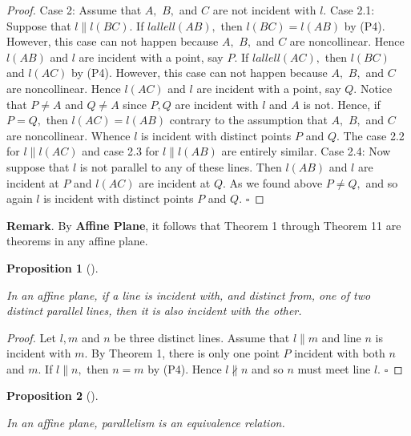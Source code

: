 \documentclass[
  twoside,
  12pt,
  letterpaper,
  fleqn]{article}
\theoremstyle{definition}
\theoremstyle{definition}
\theoremstyle{plain}
\newtheorem{proposition}{Proposition}[section]
\theoremstyle{plain}
\theoremstyle{remark}
\begin{document}
\begin{proof}
Case 2: Assume that \(A,\) \(B,\) and \(C\) are not incident with \(l.\)
Case 2.1: Suppose that \(l \parallel l(BC).\) If \(l allell(AB),\) then
\(l(BC)=l(AB)\) by (P4). However, this case can not happen because
\(A,\) \(B,\) and \(C\) are noncollinear. Hence \(l(AB)\) and \(l\) are
incident with a point, say \(P.\) If \(l allell(AC),\) then \(l(BC)\)
and \(l(AC)\) by (P4). However, this case can not happen because \(A,\)
\(B,\) and \(C\) are noncollinear. Hence \(l(AC)\) and \(l\) are
incident with a point, say \(Q.\) Notice that \(P\neq A\) and
\(Q\neq A\) since \(P, Q\) are incident with \(l\) and \(A\) is not.
Hence, if \(P=Q,\) then \(l(AC)=l(AB)\) contrary to the assumption that
\(A,\) \(B,\) and \(C\) are noncollinear. Whence \(l\) is incident with
distinct points \(P\) and \(Q.\) The case 2.2 for \(l \parallel l(AC)\)
and case 2.3 for \(l \parallel l(AB)\) are entirely similar. Case 2.4:
Now suppose that \(l\) is not parallel to any of these lines. Then
\(l(AB)\) and \(l\) are incident at \(P\) and \(l(AC)\) are incident at
\(Q.\) As we found above \(P\neq Q,\) and so again \(l\) is incident
with distinct points \(P\) and \(Q.\) \(\square\)

\end{proof}

\textbf{Remark}. By \textbf{Affine Plane}, it follows that Theorem 1
through Theorem 11 are theorems in any affine plane.

\begin{proposition}[]\protect\hypertarget{prp-five}{}\label{prp-five}

In an affine plane, if a line is incident with, and distinct from, one
of two distinct parallel lines, then it is also incident with the other.

\end{proposition}

\begin{proof}

Let \(l, m\) and \(n\) be three distinct lines. Assume that
\(l \parallel m\) and line \(n\) is incident with \(m.\) By Theorem 1,
there is only one point \(P\) incident with both \(n\) and \(m.\) If
\(l \parallel n,\) then \(n=m\) by (P4). Hence \(l\not \parallel n\) and
so \(n\) must meet line \(l.\) \(\square\)

\end{proof}

\begin{proposition}[]\protect\hypertarget{prp-five}{}\label{prp-five}

\label{parequiv} In an affine plane, parallelism is an equivalence
relation.

\end{proposition}
\end{document}
